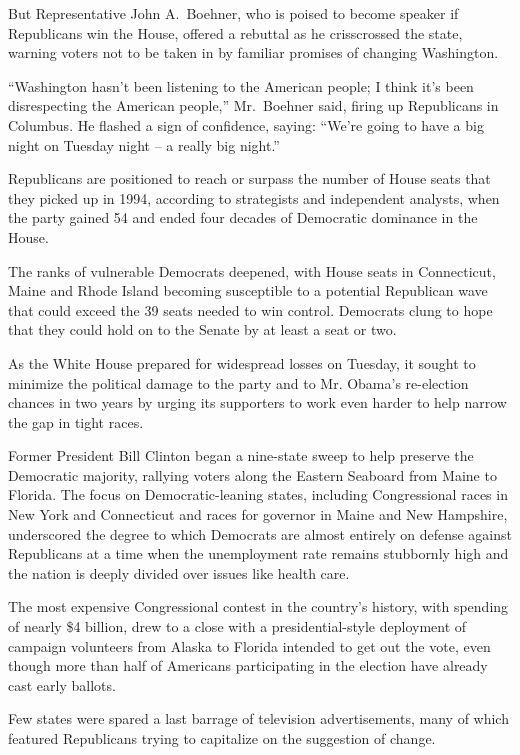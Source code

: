 ﻿\documentclass[12pt]{article}
\begin{document}
But Representative John A.~Boehner, who is poised to become speaker if Republicans win the House,
offered a rebuttal as he crisscrossed the state, warning voters not to be taken in by familiar
promises of changing Washington.

``Washington hasn't been listening to the American people; I think it's been disrespecting the
American people,'' Mr.~Boehner said, firing up Republicans in Columbus. He flashed a sign of
confidence, saying: ``We're going to have a big night on Tuesday night -- a really big night.''

Republicans are positioned to reach or surpass the number of House seats that they picked up in
1994, according to strategists and independent analysts, when the party gained 54 and ended four
decades of Democratic dominance in the House.

The ranks of vulnerable Democrats deepened, with House seats in Connecticut, Maine and Rhode Island
becoming susceptible to a potential Republican wave that could exceed the 39 seats needed to win
control. Democrats clung to hope that they could hold on to the Senate by at least a seat or two.

As the White House prepared for widespread losses on Tuesday, it sought to minimize the political
damage to the party and to Mr. Obama's re-election chances in two years by urging its supporters to
work even harder to help narrow the gap in tight races.

Former President Bill Clinton began a nine-state sweep to help preserve the Democratic majority,
rallying voters along the Eastern Seaboard from Maine to Florida. The focus on Democratic-leaning
states, including Congressional races in New York and Connecticut and races for governor in Maine
and New Hampshire, underscored the degree to which Democrats are almost entirely on defense against
Republicans at a time when the unemployment rate remains stubbornly high and the nation is deeply
divided over issues like health care.

The most expensive Congressional contest in the country's history, with spending of nearly \$4
billion, drew to a close with a presidential-style deployment of campaign volunteers from Alaska to
Florida intended to get out the vote, even though more than half of Americans participating in the
election have already cast early ballots.

Few states were spared a last barrage of television advertisements, many of which featured
Republicans trying to capitalize on the suggestion of change.
\end{document}
